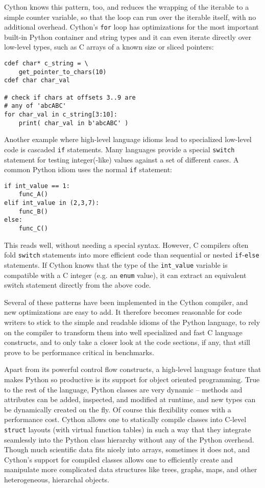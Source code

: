 \documentclass[letterpaper,11pt,english]{article}
\newcommand{\code}[1]{\texttt{#1}}
\begin{document}
Cython knows this pattern, too, and reduces the wrapping of the
iterable to a simple counter variable, so that the loop can run over
the iterable itself, with no additional overhead.  Cython's \code{for} loop
has optimizations for the most important built-in Python container and
string types and it can even iterate directly over low-level types,
such as C arrays of a known size or sliced pointers:

\begin{verbatim}
cdef char* c_string = \
    get_pointer_to_chars(10)
cdef char char_val

# check if chars at offsets 3..9 are
# any of 'abcABC'
for char_val in c_string[3:10]:
    print( char_val in b'abcABC' )
\end{verbatim}

Another example where high-level language idioms lead to specialized
low-level code is cascaded \code{if} statements.  Many languages provide a
special \code{switch} statement for testing integer(-like) values against a
set of different cases.  A common Python idiom uses the normal \code{if}
statement:

\begin{verbatim}
if int_value == 1:
    func_A()
elif int_value in (2,3,7):
    func_B()
else:
    func_C()
\end{verbatim}


This reads well, without needing a special syntax.  However, C
compilers often fold \code{switch} statements into more efficient code
than sequential or nested \code{if}-\code{else} statements.  If Cython knows
that the type of the \code{int\_value} variable is compatible with a C
integer (e.g. an \code{enum} value), it can extract an equivalent switch
statement directly from the above code.

Several of these patterns have been implemented in the Cython
compiler, and new optimizations are easy to add.  It therefore becomes
reasonable for code writers to stick to the simple and readable
idioms of the Python language, to rely on the compiler to
transform them into well specialized and fast C language constructs,
and to only take a closer look at the code sections, if any, that
still prove to be performance critical in benchmarks.

Apart from its powerful control flow constructs, a high-level language
feature that makes Python so productive is its support for object oriented
programming. True to the rest of the language, Python classes are very
dynamic -- methods and attributes can be added, inspected, and modified at
runtime, and new types can be dynamically created on the fly. Of course this
flexibility comes with a performance cost. Cython allows one to statically
compile classes into C-level \code{struct} layouts (with virtual function
tables) in such a way that they integrate seamlessly into the Python class
hierarchy without any of the Python overhead.
Though much scientific data fits nicely into arrays,
sometimes it does not, and Cython's support for compiled classes allows one
to efficiently create and manipulate more complicated data structures like
trees, graphs, maps, and other heterogeneous, hierarchal objects.
\end{document}

